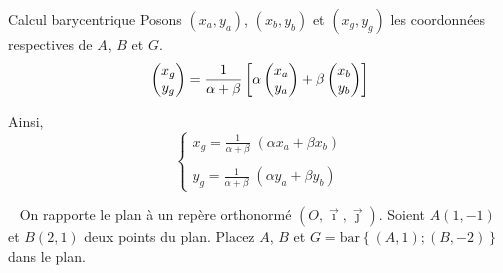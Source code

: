 \begin{chapter}{Calcul barycentrique}
Posons $(x_a , y_a)$, $(x_b , y_b)$ et $(x_g , y_g)$ les coordonn\'ees respectives de $A$, $B$ et $G$.
\begin{equation}
\label{eq:barycentre coordonnees composantes}
\left( \begin{matrix} x_g \\ y_g \end{matrix} \right) = \frac{1}{\alpha + \beta} \left[ \alpha  \left( \begin{matrix} x_a \\ y_a \end{matrix} \right)  + \beta \left( \begin{matrix} x_b \\ y_b \end{matrix} \right) \right]
\end{equation}

Ainsi, 
$$
\left\lbrace
\begin{matrix}
x_g = \frac{1}{\alpha + \beta} \; (\alpha x_a + \beta x_b) \\ 
\\
y_g = \frac{1}{\alpha + \beta} \; (\alpha y_a + \beta y_b) 
\end{matrix}
\right.
$$

\begin{exe} ~ \newline \vspace{-.2cm} \newline
\label{exe:barycentre 1}
%
On rapporte le plan \`a un rep\`ere orthonorm\'e $(O , \vec{\imath} , \vec{\jmath})$. 
Soient $A (1,-1)$ et $B(2,1)$ deux points du plan.
Placez $A$, $B$ et $G = \mathrm{bar}\left\lbrace (A,1) ; (B,-2) \right\rbrace $ 
dans le plan.


\end{exe}
\end{chapter}
